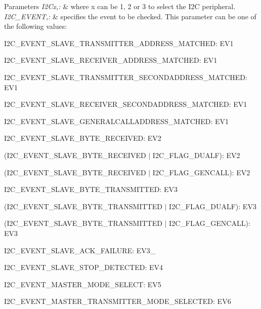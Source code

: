 \begin{DoxyParams}{Parameters}
{\em I2\-Cx,\-:} & where x can be 1, 2 or 3 to select the I2\-C peripheral. \\
\hline
{\em I2\-C\-\_\-\-E\-V\-E\-N\-T,\-:} & specifies the event to be checked. This parameter can be one of the following values\-: \begin{DoxyItemize}
\item I2\-C\-\_\-\-E\-V\-E\-N\-T\-\_\-\-S\-L\-A\-V\-E\-\_\-\-T\-R\-A\-N\-S\-M\-I\-T\-T\-E\-R\-\_\-\-A\-D\-D\-R\-E\-S\-S\-\_\-\-M\-A\-T\-C\-H\-E\-D\-: E\-V1 \item I2\-C\-\_\-\-E\-V\-E\-N\-T\-\_\-\-S\-L\-A\-V\-E\-\_\-\-R\-E\-C\-E\-I\-V\-E\-R\-\_\-\-A\-D\-D\-R\-E\-S\-S\-\_\-\-M\-A\-T\-C\-H\-E\-D\-: E\-V1 \item I2\-C\-\_\-\-E\-V\-E\-N\-T\-\_\-\-S\-L\-A\-V\-E\-\_\-\-T\-R\-A\-N\-S\-M\-I\-T\-T\-E\-R\-\_\-\-S\-E\-C\-O\-N\-D\-A\-D\-D\-R\-E\-S\-S\-\_\-\-M\-A\-T\-C\-H\-E\-D\-: E\-V1 \item I2\-C\-\_\-\-E\-V\-E\-N\-T\-\_\-\-S\-L\-A\-V\-E\-\_\-\-R\-E\-C\-E\-I\-V\-E\-R\-\_\-\-S\-E\-C\-O\-N\-D\-A\-D\-D\-R\-E\-S\-S\-\_\-\-M\-A\-T\-C\-H\-E\-D\-: E\-V1 \item I2\-C\-\_\-\-E\-V\-E\-N\-T\-\_\-\-S\-L\-A\-V\-E\-\_\-\-G\-E\-N\-E\-R\-A\-L\-C\-A\-L\-L\-A\-D\-D\-R\-E\-S\-S\-\_\-\-M\-A\-T\-C\-H\-E\-D\-: E\-V1 \item I2\-C\-\_\-\-E\-V\-E\-N\-T\-\_\-\-S\-L\-A\-V\-E\-\_\-\-B\-Y\-T\-E\-\_\-\-R\-E\-C\-E\-I\-V\-E\-D\-: E\-V2 \item (I2\-C\-\_\-\-E\-V\-E\-N\-T\-\_\-\-S\-L\-A\-V\-E\-\_\-\-B\-Y\-T\-E\-\_\-\-R\-E\-C\-E\-I\-V\-E\-D $|$ I2\-C\-\_\-\-F\-L\-A\-G\-\_\-\-D\-U\-A\-L\-F)\-: E\-V2 \item (I2\-C\-\_\-\-E\-V\-E\-N\-T\-\_\-\-S\-L\-A\-V\-E\-\_\-\-B\-Y\-T\-E\-\_\-\-R\-E\-C\-E\-I\-V\-E\-D $|$ I2\-C\-\_\-\-F\-L\-A\-G\-\_\-\-G\-E\-N\-C\-A\-L\-L)\-: E\-V2 \item I2\-C\-\_\-\-E\-V\-E\-N\-T\-\_\-\-S\-L\-A\-V\-E\-\_\-\-B\-Y\-T\-E\-\_\-\-T\-R\-A\-N\-S\-M\-I\-T\-T\-E\-D\-: E\-V3 \item (I2\-C\-\_\-\-E\-V\-E\-N\-T\-\_\-\-S\-L\-A\-V\-E\-\_\-\-B\-Y\-T\-E\-\_\-\-T\-R\-A\-N\-S\-M\-I\-T\-T\-E\-D $|$ I2\-C\-\_\-\-F\-L\-A\-G\-\_\-\-D\-U\-A\-L\-F)\-: E\-V3 \item (I2\-C\-\_\-\-E\-V\-E\-N\-T\-\_\-\-S\-L\-A\-V\-E\-\_\-\-B\-Y\-T\-E\-\_\-\-T\-R\-A\-N\-S\-M\-I\-T\-T\-E\-D $|$ I2\-C\-\_\-\-F\-L\-A\-G\-\_\-\-G\-E\-N\-C\-A\-L\-L)\-: E\-V3 \item I2\-C\-\_\-\-E\-V\-E\-N\-T\-\_\-\-S\-L\-A\-V\-E\-\_\-\-A\-C\-K\-\_\-\-F\-A\-I\-L\-U\-R\-E\-: E\-V3\-\_ \item I2\-C\-\_\-\-E\-V\-E\-N\-T\-\_\-\-S\-L\-A\-V\-E\-\_\-\-S\-T\-O\-P\-\_\-\-D\-E\-T\-E\-C\-T\-E\-D\-: E\-V4 \item I2\-C\-\_\-\-E\-V\-E\-N\-T\-\_\-\-M\-A\-S\-T\-E\-R\-\_\-\-M\-O\-D\-E\-\_\-\-S\-E\-L\-E\-C\-T\-: E\-V5 \item I2\-C\-\_\-\-E\-V\-E\-N\-T\-\_\-\-M\-A\-S\-T\-E\-R\-\_\-\-T\-R\-A\-N\-S\-M\-I\-T\-T\-E\-R\-\_\-\-M\-O\-D\-E\-\_\-\-S\-E\-L\-E\-C\-T\-E\-D\-: E\-V6 \item 
\end{DoxyItemize}
\end{DoxyParams}
